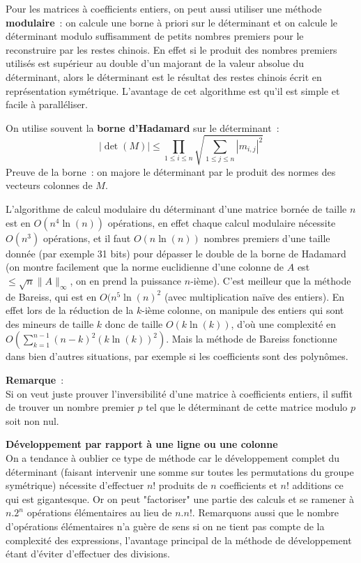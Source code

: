 \documentclass[a4paper,11pt]{article}
\begin{document}
\begin{giacjshere}
Pour les matrices \`a coefficients entiers, on peut aussi utiliser une
m\'ethode 
{\bf modulaire}~:
on calcule une borne \`a priori sur le d\'eterminant
et on calcule le d\'eterminant modulo suffisamment de petits nombres
premiers pour le reconstruire par les restes chinois. En effet
si le produit des nombres premiers utilisés
est supérieur au double d'un majorant de la valeur absolue du
déterminant, alors le déterminant est le résultat des restes chinois
écrit en représentation symétrique.
L'avantage de cet algorithme est qu'il est simple et facile à paralléliser.

On utilise souvent la {\bf borne d'Hadamard} 
sur le d\'eterminant~:
\[ |\det(M)| \leq \prod_{1\leq i \leq n} 
\sqrt{\sum_{1\leq j \leq n} |m_{i,j}|^2}\]
Preuve de la borne~: on majore le déterminant par le produit des
normes des vecteurs colonnes de $M$.

L'algorithme de calcul modulaire du déterminant d'une matrice bornée
de taille $n$ est en $O(n^4 \ln(n))$ opérations, en effet 
chaque calcul modulaire
nécessite $O(n^3)$ opérations, et il faut $O(n\ln(n))$ nombres premiers
d'une taille donnée (par exemple 31 bits)
pour dépasser le double de la borne de Hadamard 
(on montre facilement que la norme
euclidienne d'une colonne de $A$ est $\leq \sqrt{n}\|A\|_\infty$,
on en prend la puissance $n$-ième).
C'est meilleur que la méthode de Bareiss, qui est en 
$O(n^5 \ln(n)^2$ (avec multiplication naïve des entiers). En effet
lors de la réduction de la $k$-ième colonne, on manipule des entiers
qui sont des mineurs de taille $k$ donc de taille $O(k\ln(k))$, d'où
une complexité en $O(\sum_{k=1}^{n-1} (n-k)^2 (k\ln(k))^2 )$. Mais
la méthode de Bareiss fonctionne dans bien d'autres situations, par
exemple si les coefficients sont des polynômes.

{\bf Remarque}~:\\
Si on veut juste prouver l'inversibilité d'une matrice \`a coefficients
entiers, il suffit
de trouver un nombre premier $p$ tel que le déterminant de cette matrice modulo
$p$ soit non nul.

{\bf Développement par rapport à une ligne ou une colonne}\\
On a tendance à oublier ce type de méthode car le développement
complet du déterminant (faisant intervenir une somme sur toutes les
permutations du groupe symétrique)
nécessite d'effectuer $n!$ produits
de $n$ coefficients et $n!$ additions ce qui est gigantesque. Or on peut
"factoriser" une partie des calculs et se ramener à $n.2^n$ opérations
élémentaires au lieu de $n.n!$. Remarquons aussi que le nombre
d'opérations élémentaires n'a guère de sens si on ne tient pas
compte de la complexité des expressions, l'avantage principal
de la méthode de développement étant d'éviter d'effectuer
des divisions.


\end{giacjshere}
\end{document}
